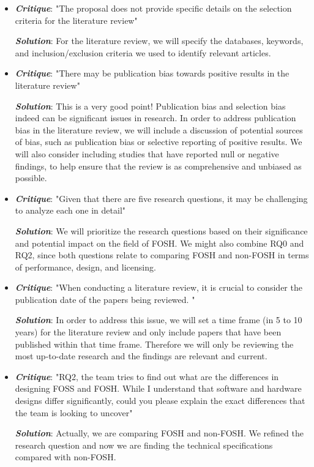 \documentclass[acmtog]{acmart}
\begin{document}
\begin{itemize}
\item {\textbf{\itshape Critique}}: "The proposal does not provide specific details on the selection criteria for the literature review" 
\par{\textbf{\itshape Solution}}: For the literature review, we will specify the databases, keywords, and inclusion/exclusion criteria we used to identify relevant articles.
\item {\textbf{\itshape Critique}}: "There may be publication bias towards positive results in the literature review" 
\par{\textbf{\itshape Solution}}: This is a very good point! Publication bias and selection bias indeed can be significant issues in research. In order to address publication bias in the literature review, we will include a discussion of potential sources of bias, such as publication bias or selective reporting of positive results. We will also consider including studies that have reported null or negative findings, to help ensure that the review is as comprehensive and unbiased as possible.
\item {\textbf{\itshape Critique}}: "Given that there are five research questions, it may be challenging to analyze each one in detail" 
\par{\textbf{\itshape Solution}}: We will prioritize the research questions based on their significance and potential impact on the field of FOSH. We might also combine RQ0 and RQ2, since both questions relate to comparing FOSH and non-FOSH in terms of performance, design, and licensing.
\item {\textbf{\itshape Critique}}: "When conducting a literature review, it is crucial to consider the publication date of the papers being reviewed.  " 
\par{\textbf{\itshape Solution}}:  In order to address this issue, we will set a time frame (in 5 to 10 years) for the literature review and only include papers that have been published within that time frame. Therefore we will only be reviewing the most up-to-date research and the findings are relevant and current. 
\item {\textbf{\itshape Critique}}: "RQ2, the team tries to find out what are the differences in designing FOSS and FOSH. While I understand that software and hardware designs differ significantly, could you please explain the exact differences that the team is looking to uncover" 
\par{\textbf{\itshape Solution}}: Actually, we are comparing FOSH and non-FOSH. We refined the research question and now we are finding the technical specifications compared with non-FOSH.

\end{itemize}
\end{document}
